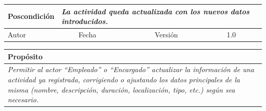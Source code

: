 \begin{table}[H]
\begin{tabular}{llllllll}
        \multicolumn{1}{|l|}{Poscondición}                           & \multicolumn{7}{p{10cm}|}{{\color[HTML]{808080} \textit{La actividad queda actualizada con los nuevos datos introducidos.}}}                                                                                                                                                                                                                                                       \\ \hline
        \multicolumn{1}{|l|}{Autor}                                  & \multicolumn{1}{l|}{{\color[HTML]{808080} \textit{}}}                           & \multicolumn{2}{l|}{Fecha}                                                   & \multicolumn{1}{l|}{}                          & \multicolumn{2}{l|}{Versión}                                                      & \multicolumn{1}{l|}{1.0}                                                     \\ \hline
        \end{tabular}
    \end{table}

    \begin{table}[H]
        \begin{tabular}{llllllll}
        \hline
        \multicolumn{8}{|l|}{\cellcolor[HTML]{F2F2F2}Propósito}                                                                                                                                                                                                                                                                                                                                                                                           \\ \hline
        \multicolumn{8}{|p{15cm}|}{{\color[HTML]{808080} \textit{Permitir al actor “Empleado” o “Encargado” actualizar la información de una actividad ya registrada, corrigiendo o ajustando los datos principales de la misma (nombre, descripción, duración, localización, tipo, etc.) según sea necesario.}}}                                                                                                                                                                                                             \\ \hline
        \end{tabular}
    \end{table}

